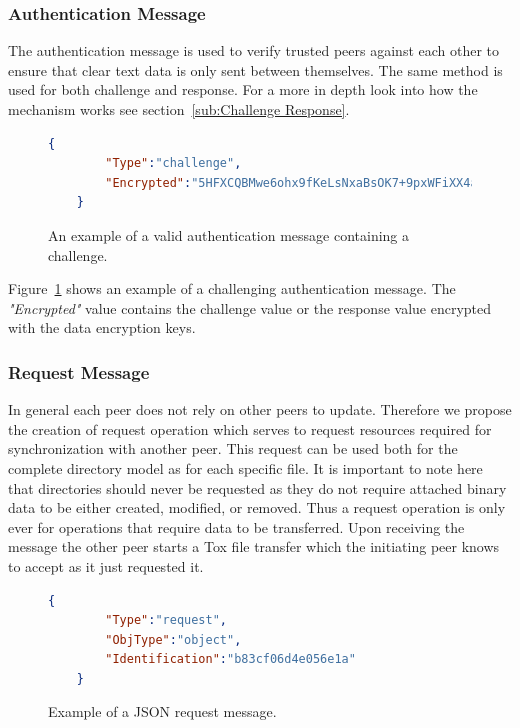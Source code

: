 \subsubsection{Authentication Message}
\label{subs:Authentication Message}

The authentication message is used to verify trusted peers against each other to ensure that clear text data is only sent between themselves.
The same method is used for both challenge and response.
For a more in depth look into how the mechanism works see section~\ref{sub:Challenge Response}.

\begin{figure}[htp]
    \begin{lstlisting}[language=json,firstnumber=0]
    {
        "Type":"challenge",
        "Encrypted":"5HFXCQBMwe6ohx9fKeLsNxaBsOK7+9pxWFiXX4aE4cRtdt8oUOHQBJ6XrowiwwgLunM="
    }
    \end{lstlisting}
\caption[Authentication Message]{An example of a valid authentication message containing a challenge.}
\label{json:authentication_message}
\end{figure}

Figure~\ref{json:authentication_message} shows an example of a challenging authentication message.
The \textit{"Encrypted"} value contains the challenge value or the response value encrypted with the data encryption keys.

\subsubsection{Request Message}
\label{subs:Request Message}

In general each peer does not rely on other peers to update.
Therefore we propose the creation of request operation which serves to request resources required for synchronization with another peer.
This request can be used both for the complete directory model as for each specific file.
It is important to note here that directories should never be requested as they do not require attached binary data to be either created, modified, or removed.
Thus a request operation is only ever for operations that require data to be transferred.
Upon receiving the message the other peer starts a Tox file transfer which the initiating peer knows to accept as it just requested it.

\begin{figure}[htp]
    \begin{lstlisting}[language=json,firstnumber=0]
    {
        "Type":"request",
        "ObjType":"object",
        "Identification":"b83cf06d4e056e1a"
    }
    \end{lstlisting}
\caption[Request Message]{Example of a JSON request message.}
\label{json:request_message}
\end{figure}


